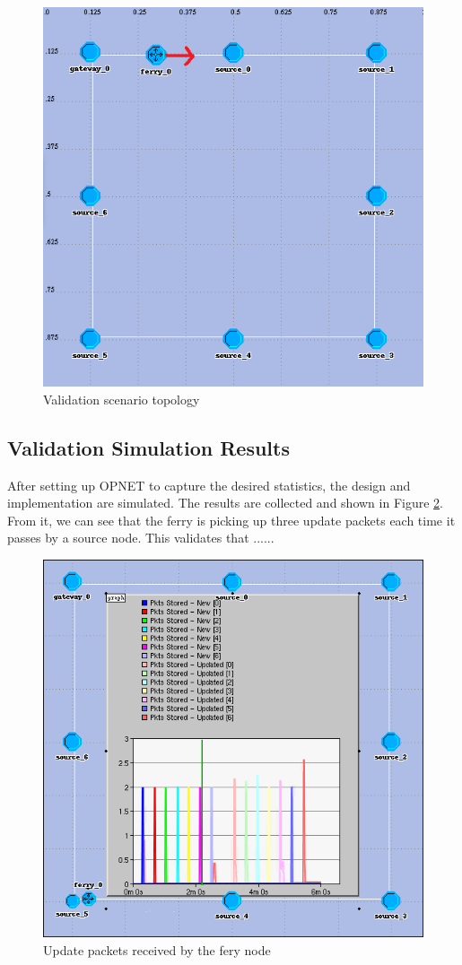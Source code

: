 \begin{figure}[ht]
    \centering
    \includegraphics[width=.5\textwidth]{images/scenario1-top1r}
    \caption{Validation scenario topology}
    \label{fig:scenario1}
\end{figure}

\subsection{Validation Simulation Results}
\label{sec:results-validate}


After setting up OPNET to capture the desired statistics, the design and implementation are simulated.  The results are collected and shown in Figure \ref{fig:result1-a}.  From it, we can see that the ferry is picking up three update packets each time it passes by a source node.  This validates that ......

\begin{figure}[ht]
    \centering
    \includegraphics[width=.5\textwidth]{images/scenario1-result-received}
    \caption{Update packets received by the fery node}
    \label{fig:result1-a}
\end{figure}

